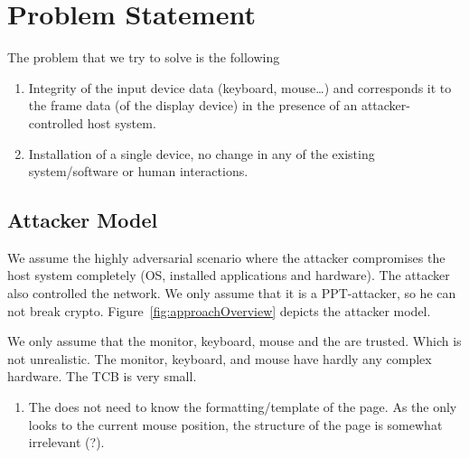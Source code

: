 \section{Problem Statement}
\label{sec:problemStatement}

The problem that we try to solve is the following

\begin{enumerate}
  \item Integrity of the input device data (keyboard, mouse\ldots) and corresponds it to the frame data (of the display device) in the presence of an attacker-controlled host system.
  \item Installation of a single device, no change in any of the existing system/software or human interactions.
\end{enumerate}

\subsection{Attacker Model}

We assume the highly adversarial scenario where the attacker compromises the host system completely (OS, installed applications and hardware). The attacker also controlled the network. We only assume that it is a PPT-attacker, so he can not break crypto. Figure~\ref{fig:approachOverview} depicts the attacker model.

We only assume that the monitor, keyboard, mouse and the \device are trusted. Which is not unrealistic. The monitor, keyboard, and mouse have hardly any complex hardware. The TCB is very small.


\begin{enumerate}
  \item The \device does not need to know the formatting/template of the page. As the \device only looks to the current mouse position, the structure of the page is somewhat irrelevant (?).
\end{enumerate}